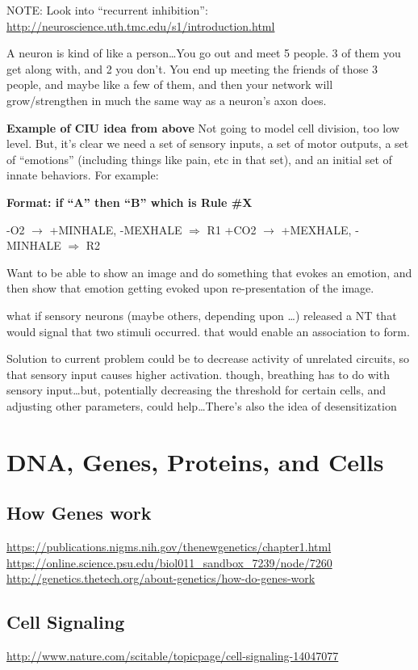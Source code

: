 \documentclass[11pt, a4paper, oneside]{article}   	%
\begin{document}
NOTE: Look into ``recurrent inhibition'': \url{http://neuroscience.uth.tmc.edu/s1/introduction.html}

A neuron is kind of like a person\ldots You go out and meet 5 people. 3 of them you get along with, and 2 you don't. You end up meeting the friends of those 3 people, and maybe like a few of them, and then your network will grow/strengthen in much the same way as a neuron's axon does.

\textbf{Example of CIU idea from above}
Not going to model cell division, too low level. But, it's clear we need a set of sensory inputs, a set of motor outputs, a set of ``emotions'' (including things like pain, etc in that set), and an initial set of innate behaviors. For example:

\textbf{Format: if ``A'' then ``B'' which is Rule \#X}
\begin{outline}
\point -O2 $\rightarrow$ +MINHALE, -MEXHALE $\Rightarrow$ R1
\point +CO2 $\rightarrow$ +MEXHALE, -MINHALE $\Rightarrow$ R2
\end{outline}

Want to be able to show an image and do something that evokes an emotion, and then show that emotion getting evoked upon re-presentation of the image. 


what if sensory neurons (maybe others, depending upon \ldots ) released a NT that would signal that two stimuli occurred. that would enable an association to form.


Solution to current problem could be to decrease activity of unrelated circuits, so that sensory input causes higher activation. though, breathing has to do with sensory input\ldots but, potentially decreasing the threshold for certain cells, and adjusting other parameters, could help\ldots There's also the idea of desensitization

\section{DNA, Genes, Proteins, and Cells}

\subsection{How Genes work}
\url{https://publications.nigms.nih.gov/thenewgenetics/chapter1.html}
\url{https://online.science.psu.edu/biol011_sandbox_7239/node/7260}
\url{http://genetics.thetech.org/about-genetics/how-do-genes-work}

\subsection{Cell Signaling}
\url{http://www.nature.com/scitable/topicpage/cell-signaling-14047077}
\end{document}
